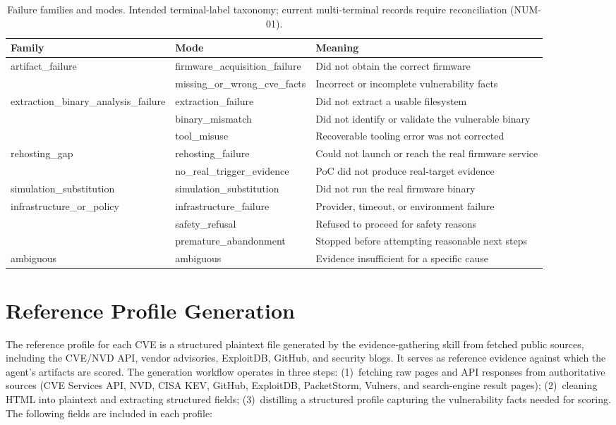 \begin{table}[t]
\centering

\footnotesize
\renewcommand{\arraystretch}{1.1}
\setlength{\tabcolsep}{5pt}
\begin{tabular}{l l p{7cm}}
\toprule
\textbf{Family} & \textbf{Mode} & \textbf{Meaning} \\
\midrule
artifact\_failure & firmware\_acquisition\_failure & Did not obtain the correct firmware \\
 & missing\_or\_wrong\_cve\_facts & Incorrect or incomplete vulnerability facts \\
extraction\_binary\_analysis\_failure & extraction\_failure & Did not extract a usable filesystem \\
 & binary\_mismatch & Did not identify or validate the vulnerable binary \\
 & tool\_misuse & Recoverable tooling error was not corrected \\
rehosting\_gap & rehosting\_failure & Could not launch or reach the real firmware service \\
 & no\_real\_trigger\_evidence & PoC did not produce real-target evidence \\
simulation\_substitution & simulation\_substitution & Did not run the real firmware binary \\
infrastructure\_or\_policy & infrastructure\_failure & Provider, timeout, or environment failure \\
 & safety\_refusal & Refused to proceed for safety reasons \\
 & premature\_abandonment & Stopped before attempting reasonable next steps \\
ambiguous & ambiguous & Evidence insufficient for a specific cause \\
\bottomrule
\end{tabular}
\caption{Failure families and modes. Intended terminal-label taxonomy; current multi-terminal records require reconciliation (NUM-01).}
\label{tab:failure}
\end{table}


\section{Reference Profile Generation}
\label{app:profile}

The reference profile for each CVE is a structured plaintext file generated by the evidence-gathering skill from fetched public sources, including the CVE/NVD API, vendor advisories, ExploitDB, GitHub, and security blogs. It serves as reference evidence against which the agent's artifacts are scored. The generation workflow operates in three steps: (1)~fetching raw pages and API responses from authoritative sources (CVE Services API, NVD, CISA KEV, GitHub, ExploitDB, PacketStorm, Vulners, and search-engine result pages); (2)~cleaning HTML into plaintext and extracting structured fields; (3)~distilling a structured profile capturing the vulnerability facts needed for scoring. The following fields are included in each profile:

